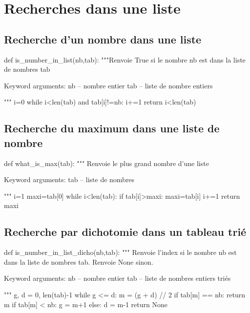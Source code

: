 \documentclass[10pt]{article}
\begin{document}


\setlength{\parskip}{0ex plus 0.2ex minus 0ex}
 \renewcommand{\contentsname}{}
 \renewcommand{\baselinestretch}{1}

\tableofcontents

 \renewcommand{\baselinestretch}{1.2}
\setlength{\parskip}{2ex plus 0.5ex minus 0.2ex}

\newpage


\section{Recherches dans une liste}
\subsection{Recherche d'un nombre dans une liste}
\begin{py}
\begin{python}
def is_number_in_list(nb,tab):
    """Renvoie True si le nombre nb est dans la liste de nombres tab
    
    Keyword arguments:
    nb -- nombre entier
    tab -- liste de nombre entiers
    
    """
    i=0
    while i<len(tab) and tab[i]!=nb:
        i+=1
    return i<len(tab)
\end{python}
\end{py}
\subsection{Recherche du maximum dans une liste de nombre}
\begin{py}
\begin{python}
def what_is_max(tab):
    """ Renvoie le plus grand nombre d'une liste
    
    Keyword arguments:
    tab -- liste de nombres 
    
    """
    i=1
    maxi=tab[0]
    while i<len(tab):
        if tab[i]>maxi:
            maxi=tab[i]
        i+=1
    return maxi
\end{python}
\end{py}
\subsection{Recherche par dichotomie dans un tableau trié}
\begin{py}
\begin{python}
def is_number_in_list_dicho(nb,tab):
    """ Renvoie l'index si le nombre nb est dans la liste de nombres tab.
        Renvoie None sinon.
    
    Keyword arguments:
    nb -- nombre entier
    tab -- liste de nombres entiers triés
    
    """
    g, d = 0, len(tab)-1
    while g <= d:
        m = (g + d) // 2
        if tab[m] == nb:
            return m
        if tab[m] < nb:
            g = m+1
        else:
            d = m-1
    return None
\end{python}
\end{py}
\end{document}
